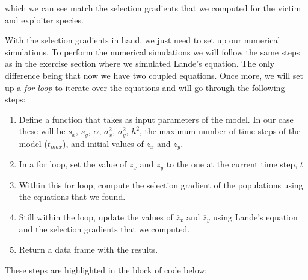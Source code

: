 \documentclass[
]{book}
\begin{document}
which we can see match the selection gradients that we computed for the victim and exploiter species.

With the selection gradients in hand, we just need to set up our numerical simulations. To perform the numerical simulations we will follow the same steps as in the exercise section where we simulated Lande's equation. The only difference being that now we have two coupled equations. Once more, we will set up a \emph{for loop} to iterate over the equations and will go through the following steps:

\begin{enumerate}
\def\labelenumi{\arabic{enumi}.}
\item
  Define a function that takes as input parameters of the model. In our case these will be \(s_{x}\), \(s_{y}\), \(\alpha\), \(\sigma^2_{x}\), \(\sigma^2_{y}\), \(h^2\), the maximum number of time steps of the model (\(t_{max}\)), and initial values of \(\overline{z}_{x}\) and \(\overline{z}_{y}\).
\item
  In a for loop, set the value of \(\overline{z}_{x}\) and \(\overline{z}_{y}\) to the one at the current time step, \(t\)
\item
  Within this for loop, compute the selection gradient of the populations using the equations that we found.
\item
  Still within the loop, update the values of \(\overline{z}_{x}\) and \(\overline{z}_{y}\) using Lande's equation and the selection gradients that we computed.
\item
  Return a data frame with the results.
\end{enumerate}

These steps are highlighted in the block of code below:
\end{document}
